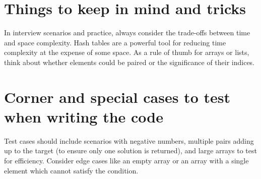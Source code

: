 \section*{Things to keep in mind and tricks}
In interview scenarios and practice, always consider the trade-offs between time and space complexity. Hash tables are a powerful tool for reducing time complexity at the expense of some space. As a rule of thumb for arrays or lists, think about whether elements could be paired or the significance of their indices.

\section*{Corner and special cases to test when writing the code}
Test cases should include scenarios with negative numbers, multiple pairs adding up to the target (to ensure only one solution is returned), and large arrays to test for efficiency. Consider edge cases like an empty array or an array with a single element which cannot satisfy the condition.